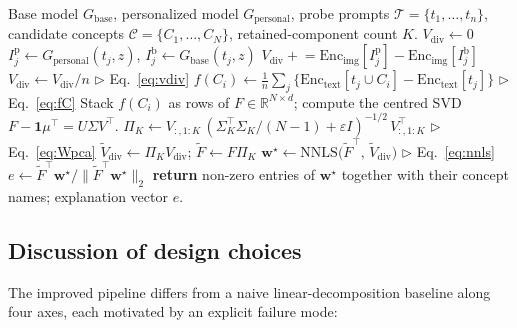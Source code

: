 \begin{algorithm}[t]
\caption{\finexl{}---improved}
\label{alg:finexl}
\begin{algorithmic}[1]
\REQUIRE Base model $G_{\mathrm{base}}$, personalized model $G_{\mathrm{personal}}$,
         probe prompts $\mathcal{T}=\{t_1,\dots,t_n\}$,
         candidate concepts $\mathcal{C}=\{C_1,\dots,C_N\}$,
         retained-component count $K$.
\STATE $V_{\mathrm{div}} \gets 0$
  \STATE $I_j^{\mathrm{p}} \gets G_{\mathrm{personal}}(t_j,z)$,\quad
         $I_j^{\mathrm{b}} \gets G_{\mathrm{base}}(t_j,z)$
  \STATE $V_{\mathrm{div}} \mathrel{+}=
         \mathrm{Enc}_{\mathrm{img}}[I_j^{\mathrm{p}}]
         - \mathrm{Enc}_{\mathrm{img}}[I_j^{\mathrm{b}}]$
\ENDFOR
\STATE $V_{\mathrm{div}} \gets V_{\mathrm{div}}/n$ \hfill $\triangleright$ Eq.~\eqref{eq:vdiv}
  \STATE $f(C_i) \gets
         \tfrac{1}{n}\sum_{j} \bigl\{
           \mathrm{Enc}_{\mathrm{text}}[t_j \cup C_i] -
           \mathrm{Enc}_{\mathrm{text}}[t_j]
         \bigr\}$ \hfill $\triangleright$ Eq.~\eqref{eq:fC}
\ENDFOR
\STATE Stack $f(C_i)$ as rows of $F\in\mathbb{R}^{N\times d}$;
       compute the centred SVD $F-\mathbf{1}\mu^\top = U\Sigma V^\top$.
\STATE $\Pi_K \gets V_{:,1:K}\,(\Sigma_K^\top\Sigma_K/(N{-}1)+\varepsilon I)^{-1/2}\,V_{:,1:K}^\top$
       \hfill $\triangleright$ Eq.~\eqref{eq:Wpca}
\STATE $\widetilde{V}_{\mathrm{div}} \gets \Pi_K V_{\mathrm{div}}$;\;
       $\widetilde{F} \gets F\Pi_K$
\STATE $\mathbf{w}^\star \gets \mathrm{NNLS}\!\bigl(\widetilde{F}^\top,\,
       \widetilde{V}_{\mathrm{div}}\bigr)$ \hfill $\triangleright$ Eq.~\eqref{eq:nnls}
\STATE $e \gets \widetilde{F}^\top \mathbf{w}^\star /
       \|\widetilde{F}^\top \mathbf{w}^\star\|_2$
\STATE \textbf{return} non-zero entries of $\mathbf{w}^\star$ together with
       their concept names; explanation vector $e$.
\end{algorithmic}
\end{algorithm}

\subsection{Discussion of design choices}
\label{sec:design}

The improved pipeline differs from a naive linear-decomposition baseline
along four axes, each motivated by an explicit failure mode:

